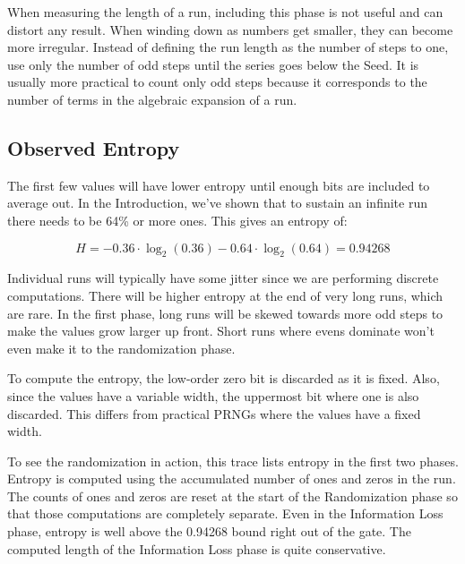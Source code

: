 \documentclass[preprint]{sigplanconf}
\begin{document}
When measuring the length of a run, including this phase is not useful and can distort any result. When winding down as numbers get smaller, they can become more irregular. Instead of defining the run length as the number of steps to one, use only the number of odd steps until the series goes below the Seed. It is usually more practical to count only odd steps because it corresponds to the number of terms in the algebraic expansion of a run.

\subsection{Observed Entropy}

The first few values will have lower entropy until enough bits are included to average out. In the Introduction, we've shown that to sustain an infinite run there needs to be 64\% or more ones. This gives an entropy of:

\[ H = -0.36 \cdot \log_2(0.36) - 0.64 \cdot \log_2(0.64) = 0.94268 \]

Individual runs will typically have some jitter since we are performing discrete computations. There will be higher entropy at the end of very long runs, which are rare. In the first phase, long runs will be skewed towards more odd steps to make the values grow larger up front. Short runs where evens dominate won't even make it to the randomization phase.

To compute the entropy, the low-order zero bit is discarded as it is fixed. Also, since the values have a variable width, the uppermost bit where one is also discarded. This differs from practical PRNGs where the values have a fixed width.

To see the randomization in action, this trace lists entropy in the first two phases. Entropy is computed using the accumulated number of ones and zeros in the run. The counts of ones and zeros are reset at the start of the Randomization phase so that those computations are completely separate. Even in the Information Loss phase, entropy is well above the 0.94268 bound right out of the gate. The computed length of the Information Loss phase is quite conservative.
\end{document}
